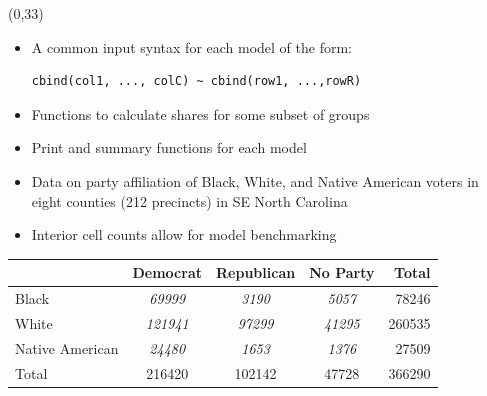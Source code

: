 \documentclass{article}
\renewcommand{\small}{\fontsize{24.88}{30}\selectfont}
\begin{document}
\begin{textblock}{12}(0,33)

\begin{itemize}
\item A common input syntax for each model of the form:
\begin{verbatim}cbind(col1, ..., colC) ~ cbind(row1, ...,rowR)\end{verbatim}
\item Functions to calculate shares for some subset of groups
\item Print and summary functions for each model
\end{itemize}
\begin{itemize}
\item Data on party affiliation of Black, White, and Native American
voters in eight counties (212 precincts) in SE North Carolina
\item Interior cell counts allow for model benchmarking
\end{itemize}

{\small
\begin{center}
\begin{tabular}{l|ccc|r}
      & Democrat & Republican & No Party & Total \\
\hline
Black & \emph{69999}        & \emph{3190}          &  \emph{5057}
& 78246 \\
White &  \emph{121941}  & \emph{97299}         &  \emph{41295}      & 260535 \\Native American & \emph{24480}     & \emph{1653}          &   \emph{1376}  & 27509 \\
\hline
Total  & 216420     & 102142        & 47728     & 366290
\end{tabular}
\end{center}}
\end{textblock}
\end{document}
